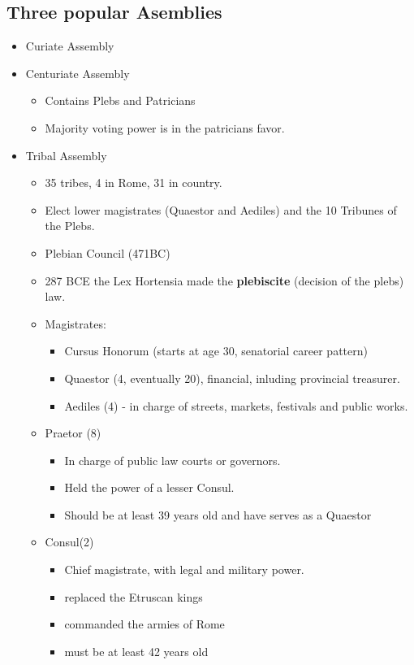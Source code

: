 \documentclass[12pt, twoside]{article}
\begin{document}
\subsection{Three popular Asemblies}
\begin{itemize}
\item Curiate Assembly
\item Centuriate Assembly
	\begin{itemize}
	\item Contains Plebs and Patricians
	\item Majority voting power is in the patricians favor. 
	\end{itemize}
\item Tribal Assembly
	\begin{itemize}
	\item 35 tribes, 4 in Rome, 31 in country.
	\item Elect lower magistrates (Quaestor and Aediles) and the 10 Tribunes of the Plebs.
	\item Plebian Council (471BC)
	\item 287 BCE the Lex Hortensia made the \textbf{plebiscite} (decision of the plebs) law.
	\item Magistrates:
		\begin{itemize}
		\item Cursus Honorum (starts at age 30, senatorial career pattern)
		\item Quaestor (4, eventually 20), financial, inluding provincial treasurer.
		\item Aediles (4) - in charge of streets, markets, festivals and public works. 
		\end{itemize}
	\item Praetor (8)
		\begin{itemize}
		\item In charge of public law courts or governors.
		\item Held the power of a lesser Consul.
		\item Should be at least 39 years old and have serves as a Quaestor
		\end{itemize}
	\item Consul(2)
		\begin{itemize}
		\item Chief magistrate, with legal and military power.
		\item replaced the Etruscan kings
		\item commanded the armies of Rome
		\item must be at least 42 years old

\end{itemize}
\end{itemize}
\end{itemize}
\end{document}
